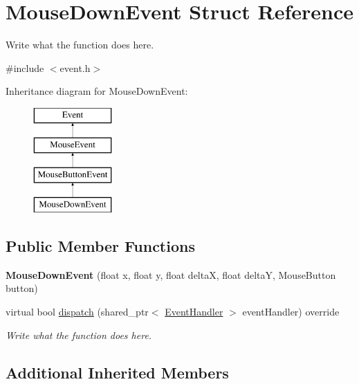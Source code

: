 \hypertarget{structMouseDownEvent}{\section{Mouse\+Down\+Event Struct Reference}
\label{structMouseDownEvent}
}


Write what the function does here.  




{\ttfamily \#include $<$event.\+h$>$}

Inheritance diagram for Mouse\+Down\+Event\+:\begin{figure}[H]
\begin{center}
\leavevmode
\includegraphics[height=4.000000cm]{structMouseDownEvent}
\end{center}
\end{figure}
\subsection*{Public Member Functions}
\begin{DoxyCompactItemize}
\item 
\hypertarget{structMouseDownEvent_a297d7e50d7363addef438a1a7e0981a8}{{\bfseries Mouse\+Down\+Event} (float x, float y, float delta\+X, float delta\+Y, Mouse\+Button button)}\label{structMouseDownEvent_a297d7e50d7363addef438a1a7e0981a8}

\item 
virtual bool \hyperlink{structMouseDownEvent_a4c3d79107e6cef049a76089fd2b5b431}{dispatch} (shared\+\_\+ptr$<$ \hyperlink{structEventHandler}{Event\+Handler} $>$ event\+Handler) override
\begin{DoxyCompactList}\small\item\em Write what the function does here. \end{DoxyCompactList}\end{DoxyCompactItemize}
\subsection*{Additional Inherited Members}


